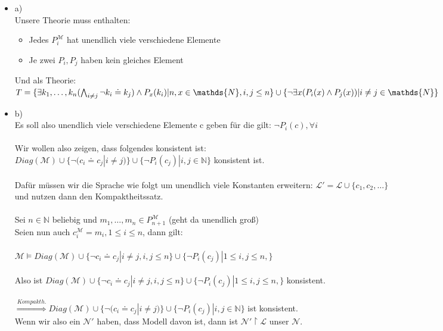 \documentclass[a4paper]{scrartcl}%
\begin{document}
    \begin{itemize}
        \item a)\\
            Unsere Theorie muss enthalten:\\%
            \begin{itemize}
                \item Jedes $P_i^\mathcal{M}$ hat unendlich viele verschiedene Elemente\\
                \item Je zwei $P_i, P_j$ haben kein gleiches Element\\
            \end{itemize}
            Und als Theorie:\\
            $T = \{\exists k_1,\dots,k_n(\bigwedge_{i \neq j} \neg k_i \doteq k_j) \land P_x(k_i)| n,x \in \mathds{N}, i,j\leq n\}\\
            \cup \{\neg \exists x (P_i(x) \land P_j(x)) | i \neq j \in \mathds{N}\}$\\%
        \item b)\\
            Es soll also unendlich viele verschiedene Elemente c geben für die gilt: $\neg P_i(c), \forall i$\\%

            \\Wir wollen also zeigen, dass folgendes konsistent ist:\\
            $Diag(\mathcal{M}) \cup \{\neg (c_i \doteq c_j | i \neq j)\} \cup \{\neg P_i(c_j) | i,j\in \mathds{N}\}$ konsistent ist.\\
            \\Dafür müssen wir die Sprache wie folgt um unendlich viele Konstanten erweitern: $ \mathscr{L}' = \mathscr{L} \cup \{c_1,c_2,\dots\}$\\
            und nutzen dann den Kompaktheitssatz.\\
            \\Sei $n \in \mathds{N}$ beliebig und $m_1,\dots,m_n \in P_{n+1}^\mathcal{M}$ (geht da unendlich groß)\\
            Seien nun auch $c_i^\mathcal{M} = m_i, 1 \leq i \leq n$, dann gilt:\\
            \\$\mathcal{M} \vDash Diag(\mathcal{M}) \cup \{\neg c_i \doteq c_j |i\neq j, i,j\leq n\} \cup \{\neg P_i(c_j) | 1\leq i,j \leq n,\}$\\
            \\Also ist $Diag(\mathcal{M}) \cup \{\neg c_i \doteq c_j |i\neq j, i,j\leq n\} \cup \{\neg P_i(c_j) | 1\leq i,j \leq n,\}$ konsistent.\\
            \\$\overset{Kompakth.}{\Rightarrow} Diag(\mathcal{M}) \cup \{\neg (c_i \doteq c_j | i \neq j)\} \cup \{\neg P_i(c_j) | i,j\in \mathds{N}\}$ ist konsistent.\\
            Wenn wir also ein $\mathcal{N}'$ haben, dass Modell davon ist, dann ist $\mathcal{N}'\upharpoonright \mathscr{L}$ unser $\mathcal{N}$.\\%


\end{itemize}
\end{document}
